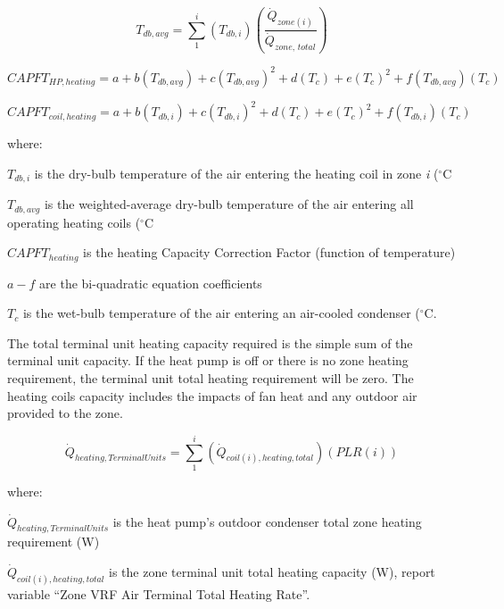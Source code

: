 \begin{equation}
  T_{db,avg} = \sum\limits_1^i \left( T_{db,i} \right) \left( \frac{\dot{Q}_{zone(i)}}{\dot{Q}_{zone,\,total}} \right)
\end{equation}

\begin{equation}
  CAPFT_{HP,heating} = a + b \left( T_{db,avg} \right) + c \left( T_{db,avg} \right)^2 + d \left( T_c \right) + e \left( T_c \right)^2 + f \left( T_{db,avg} \right) \left( T_c \right)
\end{equation}

\begin{equation}
  CAPFT_{coil,heating} = a + b \left( T_{db,i} \right) + c \left( T_{db,i} \right)^2 + d \left( T_c \right) + e \left( T_c \right)^2 + f \left( T_{db,i} \right) \left( T_c \right)
\end{equation}

where:

\(T_{db,i}\) is the dry-bulb temperature of the air entering the heating coil in zone \emph{i} (\(^{\circ}\)C

\(T_{db,avg}\) is the weighted-average dry-bulb temperature of the air entering all operating heating coils (\(^{\circ}\)C

\(CAPFT_{heating}\) is the heating Capacity Correction Factor (function of temperature)

\(a - f\) are the bi-quadratic equation coefficients

\(T_c\) is the wet-bulb temperature of the air entering an air-cooled condenser (\(^{\circ}\)C.

The total terminal unit heating capacity required is the simple sum of the terminal unit capacity. If the heat pump is off or there is no zone heating requirement, the terminal unit total heating requirement will be zero. The heating coils capacity includes the impacts of fan heat and any outdoor air provided to the zone.

\begin{equation}
  \dot{Q}_{heating,TerminalUnits} = \sum\limits_1^i \left( \dot{Q}_{coil(i),heating,total} \right) \left( PLR(i) \right)
\end{equation}

where:

\(\dot{Q}_{heating,TerminalUnits}\) is the heat pump's outdoor condenser total zone heating requirement (W)

\(\dot{Q}_{coil(i),heating,total}\) is the zone terminal unit total heating capacity (W), report variable ``Zone VRF Air Terminal Total Heating Rate''.

